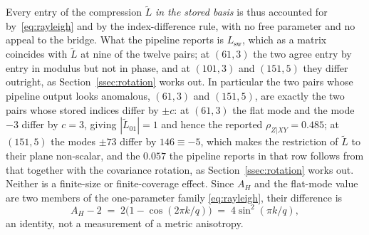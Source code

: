 \documentclass[11pt,a4paper]{article}
\begin{document}
    \noindent
    Every entry of the compression $\tilde L$ \emph{in the stored basis} is thus accounted for
    by~\eqref{eq:rayleigh} and by the index-difference rule, with no free parameter and no appeal
    to the bridge. What the pipeline reports is $L_{\mathrm{sw}}$, which as a matrix coincides with
    $\tilde L$ at nine of the twelve pairs; at $(61,3)$ the two agree entry by entry in modulus but
    not in phase, and at $(101,3)$ and $(151,5)$ they differ outright, as
    Section~\ref{ssec:rotation} works out.
    In particular the two pairs whose pipeline output looks anomalous, $(61,3)$ and $(151,5)$,
    are exactly the two pairs whose stored indices differ by $\pm c$: at $(61,3)$ the flat mode and
    the mode $-3$ differ by $c = 3$, giving $|\tilde L_{01}| = 1$ and hence the reported
    $\rho_{Z|XY} = 0.485$; at $(151,5)$ the modes $\pm 73$ differ by $146 \equiv -5$, which makes the
    restriction of $\tilde L$ to their plane non-scalar, and the $0.057$ the pipeline reports in that row follows
    from that together with the covariance rotation, as Section~\ref{ssec:rotation} works out.
    Neither is a finite-size or finite-coverage effect.
    Since $A_H$ and the flat-mode value are two members of the one-parameter family
    \eqref{eq:rayleigh}, their difference is
    \begin{equation}
      \label{eq:gap}
      A_H - 2 \;=\; 2\bigl(1 - \cos(2\pi k/q)\bigr) \;=\; 4\sin^2(\pi k/q),
    \end{equation}
    an identity, not a measurement of a metric anisotropy.
\end{document}

